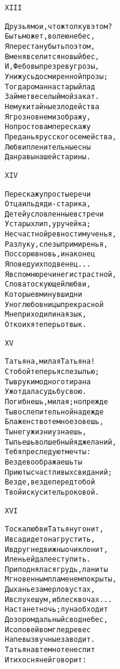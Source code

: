 \begin{minipage}[t]{\dimexpr 0.5\textwidth -\tabcolsep-.5pt}
\begin{alltt}\normalfont\centering
XIII

Друзья мои, что ж толку в этом?
Быть может, волею небес,
Я перестану быть поэтом,
В меня вселится новый бес,
И, Фебовы презрев угрозы,
Унижусь до смиренной прозы;
Тогда роман на старый лад
Займет веселый мой закат.
Не муки тайные злодейства
Я грозно в нем изображу,
Но просто вам перескажу
Преданья русского семейства,
Любви пленительные сны
Да нравы нашей старины.
\end{alltt}
\end{minipage}

\begin{minipage}[t]{\dimexpr 0.5\textwidth -\tabcolsep-.5pt}
\begin{alltt}\normalfont\centering
XIV

Перескажу простые речи
Отца иль дяди-старика,
Детей условленные встречи
У старых лип, у ручейка;
Несчастной ревности мученья,
Разлуку, слезы примиренья,
Поссорю вновь, и наконец
Я поведу их под венец...
Я вспомню речи неги страстной,
Слова тоскующей любви,
Которые в минувши дни
У ног любовницы прекрасной
Мне приходили на язык,
От коих я теперь отвык.
\end{alltt}
\end{minipage}
\clearpage

\begin{minipage}[t]{\dimexpr 0.5\textwidth -\tabcolsep-.5pt}
\begin{alltt}\normalfont\centering
XV

Татьяна, милая Татьяна!
С тобой теперь я слезы лью;
Ты в руки модного тирана
Уж отдала судьбу свою.
Погибнешь, милая; но прежде
Ты в ослепительной надежде
Блаженство темное зовешь,
Ты негу жизни узнаешь,
Ты пьешь волшебный яд желаний,
Тебя преследуют мечты:
Везде воображаешь ты
Приюты счастливых свиданий;
Везде, везде перед тобой
Твой искуситель роковой.
\end{alltt}
\end{minipage}

\begin{minipage}[t]{\dimexpr 0.5\textwidth -\tabcolsep-.5pt}
\begin{alltt}\normalfont\centering
XVI

Тоска любви Татьяну гонит,
И в сад идет она грустить,
И вдруг недвижны очи клонит,
И лень ей далее ступить.
Приподнялася грудь, ланиты
Мгновенным пламенем покрыты,
Дыханье замерло в устах,
И в слухе шум, и блеск в очах...
Настанет ночь; луна обходит
Дозором дальный свод небес,
И соловей во мгле древес
Напевы звучные заводит.
Татьяна в темноте не спит
И тихо с няней говорит:
\end{alltt}
\end{minipage}
\clearpage


